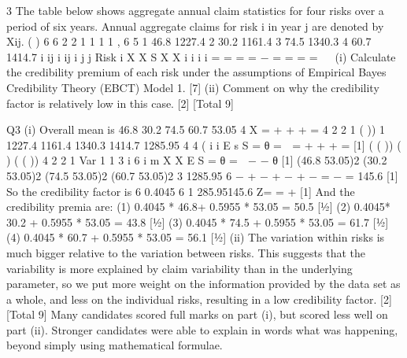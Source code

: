 \documentclass[]{report}
\begin{document}
3 The table below shows aggregate annual claim statistics for four risks over a period of
six years. Annual aggregate claims for risk i in year j are denoted by Xij.
( ) 6 6 2 2
1 1
1 1 ,
6 5
1 46.8 1227.4
2 30.2 1161.4
3 74.5 1340.3
4 60.7 1414.7
i ij i ij i
j j
Risk i X X S X X
i
i
i
i
= =
  = = −
=
  =
  =
  =
   
(i) Calculate the credibility premium of each risk under the assumptions of
Empirical Bayes Credibility Theory (EBCT) Model 1. [7]
(ii) Comment on why the credibility factor is relatively low in this case. [2]
[Total 9]

\newpage
Q3 (i) Overall mean is 46.8 30.2 74.5 60.7 53.05
4
X = + + + = 
4
2 2
1
( )) 1 1227.4 1161.4 1340.3 1414.7 1285.95
4 4
( i
  i
  E s S
  =
    θ =  = + + + = [1]
  ( ( )) ( ) ( ( )) 4 2 2
  1
  Var 1 1
  3 i 6
  i
  m X X E S
  =
    θ =  − − θ [1]
  (46.8 53.05)2 (30.2 53.05)2 (74.5 53.05)2 (60.7 53.05)2
  3
  1285.95
  6
  − + − + − + −
  =
    −
  = 145.6 [1]
  So the credibility factor is 6 0.4045
  6 1 285.95145.6
  Z= =
    +
    [1]
  And the credibility premia are:
    (1) 0.4045 * 46.8+ 0.5955 * 53.05 = 50.5 [½]
  (2) 0.4045* 30.2 + 0.5955 * 53.05 = 43.8 [½]
  (3) 0.4045 * 74.5 + 0.5955 * 53.05 = 61.7 [½]
  (4) 0.4045 * 60.7 + 0.5955 * 53.05 = 56.1 [½]
  (ii) The variation within risks is much bigger relative to the variation between
  risks. This suggests that the variability is more explained by claim variability
  than in the underlying parameter, so we put more weight on the information
  provided by the data set as a whole, and less on the individual risks, resulting
  in a low credibility factor. [2]
  [Total 9]
  Many candidates scored full marks on part (i), but scored less well on part (ii).
  Stronger candidates were able to explain in words what was happening,
  beyond simply using mathematical formulae.

  
\end{document}
